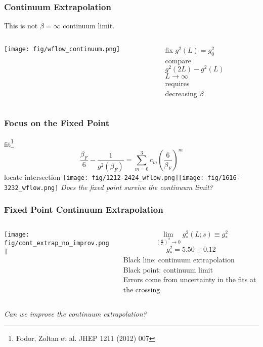 \begin{frame}
  \frametitle{Continuum Extrapolation}
  This is not $\beta = \infty$ continuum limit.
  \begin{columns}
    \begin{column}{0.7\textwidth}
      \texttt{[image: fig/wflow\_continuum.png]}
    \end{column}
    \begin{column}{0.3\textwidth}
      \begin{center}
        fix $g^2(L)=g_0^2$\\\vspace{24pt}
        compare\\$g^2(2L)-g^2(L)$\\\vspace{24pt}
        $L\rightarrow \infty$\\requires\\decreasing $\beta$
      \end{center}
    \end{column}
  \end{columns}
\end{frame}

\begin{frame}
  \frametitle{Focus on the Fixed Point}
  fit\footnote{Fodor, Zoltan et al. JHEP 1211 (2012) 007} $$\frac{\beta_F}{6}-\frac{1}{g^2(\beta_F)}=\sum_{m=0}^3 c_m(\frac{6}{\beta_F})^m$$
    locate intersection
  \texttt{[image: fig/1212-2424\_wflow.png]}\texttt{[image: fig/1616-3232\_wflow.png]}
  \newline
  \emph{Does the fixed point survive the continuum limit?}
\end{frame}

\begin{frame}
  \frametitle{Fixed Point Continuum Extrapolation}
  \begin{columns}[T]
    \begin{column}{.65\textwidth}
      \texttt{[image: fig/cont\_extrap\_no\_improv.png]}
    \end{column}
    \begin{column}{.35\textwidth}
      \begin{equation*}
        \lim_{(\frac{a}{L})^2\to 0} g^2_*(L;s)\equiv g^2_*
      \end{equation*}
      \begin{equation*}
        g^2_*=5.50\pm0.12
      \end{equation*}
      \footnotesize
      Black line: continuum extrapolation\\
      \vspace{12pt}
      Black point: continuum limit\\
      \vspace{12pt}
      Errors come from uncertainty in the fits at the crossing
    \end{column}
  \end{columns}
  \vspace{12pt}
  \emph{Can we improve the continuum extrapolation?}
\end{frame}

